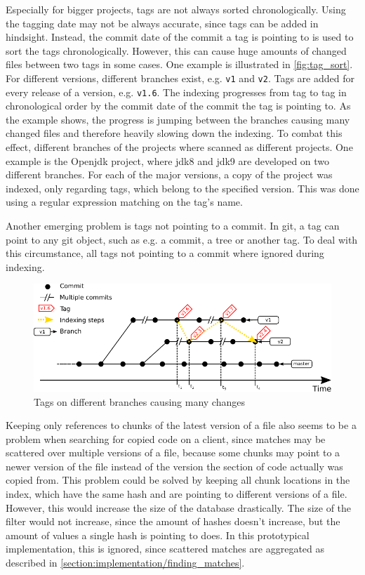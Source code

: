 Especially for bigger projects, tags are not always sorted chronologically.
Using the tagging date may not be always accurate, since tags can be added in hindsight.
Instead, the commit date of the commit a tag is pointing to is used to sort the tags chronologically.
However, this can cause huge amounts of changed files between two tags in some cases.
One example is illustrated in \autoref{fig:tag_sort}.
For different versions, different branches exist, e.g. \texttt{v1} and \texttt{v2}.
Tags are added for every release of a version, e.g. \texttt{v1.6}.
The indexing progresses from tag to tag in chronological order by the commit date of the commit the tag is pointing to.
As the example shows, the progress is jumping between the branches causing many changed files and therefore heavily slowing down the indexing.
To combat this effect, different branches of the projects where scanned as different projects.
One example is the Openjdk project, where jdk8 and jdk9 are developed on two different branches.
For each of the major versions, a copy of the project was indexed, only regarding tags, which belong to the specified version.
This was done using a regular expression matching on the tag's name.

Another emerging problem is tags not pointing to a commit.
In git, a tag can point to any git object, such as e.g. a commit, a tree or another tag.
To deal with this circumstance, all tags not pointing to a commit where ignored during indexing.

\begin{figure}[h]
	\centering
	\includegraphics{figures/tag_sort.pdf}
	\caption{Tags on different branches causing many changes}\label{fig:tag_sort}
\end{figure}

Keeping only references to chunks of the latest version of a file also seems to be a problem when searching for copied code on a client, since matches may be scattered over multiple versions of a file, because some chunks may point to a newer version of the file instead of the version the section of code actually was copied from.
This problem could be solved by keeping all chunk locations in the index, which have the same hash and are pointing to different versions of a file.
However, this would increase the size of the database drastically.
The size of the filter would not increase, since the amount of hashes doesn't increase, but the amount of values a single hash is pointing to does.
In this prototypical implementation, this is ignored, since scattered matches are aggregated as described in \autoref{section:implementation/finding_matches}.

